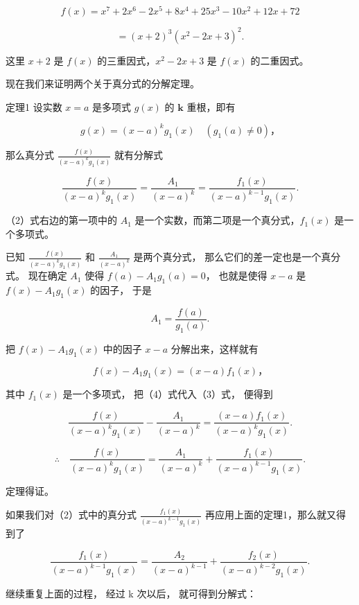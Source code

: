 \[
f (x) = x ^ {7} + 2 x ^ {6} - 2 x ^ {5} + 8 x ^ {4} + 25 x ^ {3} - 10 x ^ {2} + 12 x + 72
\]

\[
= (x + 2) ^ {3} \left(x ^ {2} - 2 x + 3\right) ^ {2}.
\]

这里 \(x + 2\) 是 \(f(x)\) 的三重因式，\(x^2 - 2x + 3\) 是 \(f(x)\)
的二重因式。

现在我们来证明两个关于真分式的分解定理。

定理1 设实数 \(x = a\) 是多项式 \(g(x)\) 的 \(\pmb{k}\) 重根，即有

\[
g (x) = (x - a) ^ {k} g _ {1} (x) \quad (g _ {1} (a) \neq 0)\text{，}
\]

那么真分式 \(\frac{f(x)}{(x - a)^k g_1(x)}\) 就有分解式

\[
\frac {f (x)}{(x - a) ^ {k} g _ {1} (x)} = \frac {A _ {1}}{(x - a) ^ {k}} = \frac {f _ {1} (x)}{(x - a) ^ {k - 1} g _ {1} (x)}. \tag {2}
\]

（2）式右边的第一项中的 \(A_{1}\)
是一个实数，而第二项是一个真分式，\(f_{1}(x)\) 是一个多项式。

 已知 \(\frac{f(x)}{(x - a)^k g_1(x)}\) 和
\(\frac{A_1}{(x - a)^k}\) 是两个真分式，
那么它们的差一定也是一个真分式。 现在确定 \(A_1\) 使得
\(f(a) - A_1 g_1(a) = 0\)， 也就是使得 \(x - a\) 是
\(f(x) - A_1 g_1(x)\) 的因子， 于是

\[
A _ {1} = \frac {f (a)}{g _ {1} (a)}.
\]

把 \(f(x) - A_{1}g_{1}(x)\) 中的因子 \(x - a\) 分解出来，这样就有

\[
f (x) - A _ {1} g _ {1} (x) = (x - a) f _ {1} (x)\text{，} \tag {4}
\]

其中 \(f_{1}(x)\) 是一个多项式， 把（4）式代入（3）式， 便得到

\[
\frac {f (x)}{(x - a) ^ {k} g _ {1} (x)} - \frac {A _ {1}}{(x - a) ^ {k}} = \frac {(x - a) f _ {1} (x)}{(x - a) ^ {k} g _ {1} (x)}.
\]

\[
\therefore \quad \frac {f (x)}{(x - a) ^ {k} g _ {1} (x)} = \frac {A _ {1}}{(x - a) ^ {k}} + \frac {f _ {1} (x)}{(x - a) ^ {k - 1} g _ {1} (x)}.
\]

定理得证。

如果我们对（2）式中的真分式 \(\frac{f_1(x)}{(x - a)^{k - 1}g_1(x)}\)
再应用上面的定理1，那么就又得到了

\[
\frac {f _ {1} (x)}{(x - a) ^ {k - 1} g _ {1} (x)} = \frac {A _ {2}}{(x - a) ^ {k - 1}} + \frac {f _ {2} (x)}{(x - a) ^ {k - 2} g _ {1} (x)}.
\]

继续重复上面的过程， 经过 k 次以后， 就可得到分解式：

